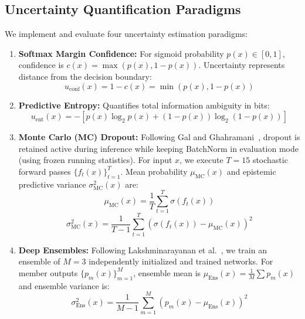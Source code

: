 \documentclass[11pt,journal,onecolumn]{IEEEtran}
\begin{document}
\subsection{Uncertainty Quantification Paradigms}
We implement and evaluate four uncertainty estimation paradigms:
\begin{enumerate}
    \item \textbf{Softmax Margin Confidence:} For sigmoid probability $p(x) \in [0, 1]$, confidence is $c(x) = \max(p(x), 1 - p(x))$. Uncertainty represents distance from the decision boundary:
    \begin{equation}
    u_{\text{conf}}(x) = 1 - c(x) = \min(p(x), 1 - p(x))
    \end{equation}
    \item \textbf{Predictive Entropy:} Quantifies total information ambiguity in bits:
    \begin{equation}
    u_{\text{ent}}(x) = -\left[ p(x) \log_2 p(x) + (1 - p(x)) \log_2(1 - p(x)) \right]
    \end{equation}
    \item \textbf{Monte Carlo (MC) Dropout:} Following Gal and Ghahramani~\cite{gal2016dropout}, dropout is retained active during inference while keeping BatchNorm in evaluation mode (using frozen running statistics). For input $x$, we execute $T=15$ stochastic forward passes $\{f_t(x)\}_{t=1}^T$. Mean probability $\mu_{\text{MC}}(x)$ and epistemic predictive variance $\sigma^2_{\text{MC}}(x)$ are:
    \begin{equation}
    \mu_{\text{MC}}(x) = \frac{1}{T} \sum_{t=1}^T \sigma(f_t(x))
    \end{equation}
    \begin{equation}
    \sigma^2_{\text{MC}}(x) = \frac{1}{T - 1} \sum_{t=1}^T \left(\sigma(f_t(x)) - \mu_{\text{MC}}(x)\right)^2
    \end{equation}
    \item \textbf{Deep Ensembles:} Following Lakshminarayanan et al.~\cite{lakshminarayanan2017simple}, we train an ensemble of $M=3$ independently initialized and trained networks. For member outputs $\{p_m(x)\}_{m=1}^M$, ensemble mean is $\mu_{\text{Ens}}(x) = \frac{1}{M} \sum p_m(x)$ and ensemble variance is:
    \begin{equation}
    \sigma^2_{\text{Ens}}(x) = \frac{1}{M - 1} \sum_{m=1}^M \left(p_m(x) - \mu_{\text{Ens}}(x)\right)^2
    \end{equation}
\end{enumerate}
\end{document}
